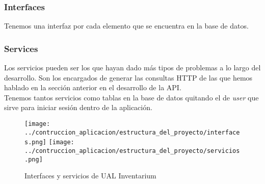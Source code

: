 \subsubsection{Interfaces}
Tenemos una interfaz por cada elemento que se encuentra en la base de datos.

\subsubsection{Services}
Los servicios pueden ser los que hayan dado más tipos de problemas a lo largo del desarrollo. Son los encargados de generar las consultas HTTP de las que hemos hablado en la sección anterior en el desarrollo de la API.
\\Tenemos tantos servicios como tablas en la base de datos quitando el de \textit{user} que sirve para iniciar sesión dentro de la aplicación.

\begin{figure}[h]
    \centering
    \texttt{[image: ../contruccion\_aplicacion/estructura\_del\_proyecto/interfaces.png]}
    \texttt{[image: ../contruccion\_aplicacion/estructura\_del\_proyecto/servicios.png]}
    \caption{Interfaces y servicios de UAL Inventarium}
\end{figure}



